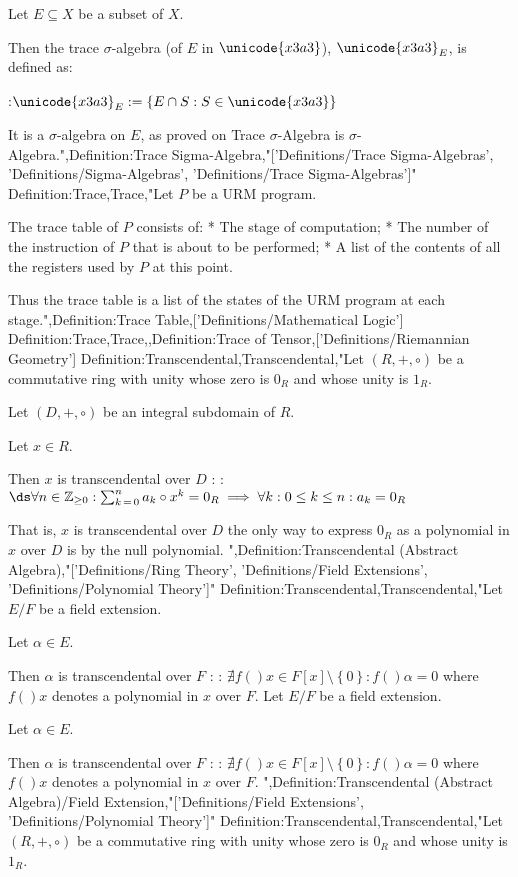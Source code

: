 Let $E \subseteq X$ be a subset of $X$.


Then the trace $\sigma$-algebra (of $E$ in $\unicode{x3a3}$), $\unicode{x3a3}_E$, is defined as:

:$\unicode{x3a3}_E := \left\lbrace E \cap S: S \in \unicode{x3a3} \right\rbrace$


It is a $\sigma$-algebra on $E$, as proved on Trace $\sigma$-Algebra is $\sigma$-Algebra.",Definition:Trace Sigma-Algebra,"['Definitions/Trace Sigma-Algebras', 'Definitions/Sigma-Algebras', 'Definitions/Trace Sigma-Algebras']"
Definition:Trace,Trace,"Let $P$ be a URM program.

The trace table of $P$ consists of:
* The stage of computation;
* The number of the instruction of $P$ that is about to be performed;
* A list of the contents of all the registers used by $P$ at this point.

Thus the trace table is a list of the states of the URM program at each stage.",Definition:Trace Table,['Definitions/Mathematical Logic']
Definition:Trace,Trace,,Definition:Trace of Tensor,['Definitions/Riemannian Geometry']
Definition:Transcendental,Transcendental,"Let $\left( R, +, \circ \right)$ be a commutative ring with unity whose zero is $0_R$ and whose unity is $1_R$.

Let $\left( D, +, \circ \right)$ be an integral subdomain of $R$.

Let $x \in R$.


Then $x$ is transcendental over $D$ :
:$\ds \forall n \in \mathbb Z_{\ge 0}: \sum_{k \mathop = 0}^n a_k \circ x^k = 0_R \implies \forall k: 0 \le k \le n: a_k = 0_R$


That is, $x$ is transcendental over $D$  the only way to express $0_R$ as a polynomial in $x$ over $D$ is by the null polynomial.
",Definition:Transcendental (Abstract Algebra),"['Definitions/Ring Theory', 'Definitions/Field Extensions', 'Definitions/Polynomial Theory']"
Definition:Transcendental,Transcendental,"Let $E / F$ be a field extension.

Let $\alpha \in E$.


Then $\alpha$ is transcendental over $F$ :
: $\nexists f \left(   \right)x \in F \left[ x \right] \setminus \left\lbrace 0 \right\rbrace: f \left(   \right)\alpha = 0$
where $f \left(   \right)x$ denotes a polynomial in $x$ over $F$.
Let $E / F$ be a field extension.

Let $\alpha \in E$.


Then $\alpha$ is transcendental over $F$ :
: $\nexists f \left(   \right)x \in F \left[ x \right] \setminus \left\lbrace 0 \right\rbrace: f \left(   \right)\alpha = 0$
where $f \left(   \right)x$ denotes a polynomial in $x$ over $F$.
",Definition:Transcendental (Abstract Algebra)/Field Extension,"['Definitions/Field Extensions', 'Definitions/Polynomial Theory']"
Definition:Transcendental,Transcendental,"Let $\left( R, +, \circ \right)$ be a commutative ring with unity whose zero is $0_R$ and whose unity is $1_R$.

